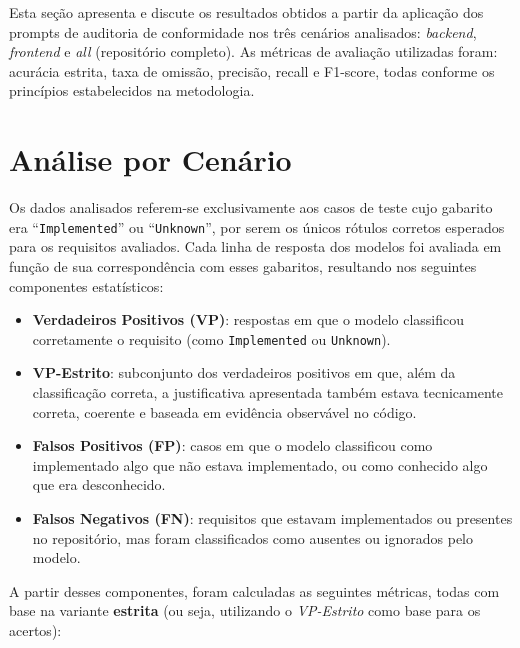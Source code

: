 \label{cap:resultados}

Esta seção apresenta e discute os resultados obtidos a partir da aplicação dos prompts de auditoria de conformidade nos três cenários analisados: \textit{backend}, \textit{frontend} e \textit{all} (repositório completo). As métricas de avaliação utilizadas foram: acurácia estrita, taxa de omissão, precisão, recall e F1-score, todas conforme os princípios estabelecidos na metodologia.

\section{Análise por Cenário}

Os dados analisados referem-se exclusivamente aos casos de teste cujo gabarito era “\texttt{Implemented}” ou “\texttt{Unknown}”, por serem os únicos rótulos corretos esperados para os requisitos avaliados. Cada linha de resposta dos modelos foi avaliada em função de sua correspondência com esses gabaritos, resultando nos seguintes componentes estatísticos:

\begin{itemize}
    \item \textbf{Verdadeiros Positivos (VP)}: respostas em que o modelo classificou corretamente o requisito (como \texttt{Implemented} ou \texttt{Unknown}).
    \item \textbf{VP-Estrito}: subconjunto dos verdadeiros positivos em que, além da classificação correta, a justificativa apresentada também estava tecnicamente correta, coerente e baseada em evidência observável no código.
    \item \textbf{Falsos Positivos (FP)}: casos em que o modelo classificou como implementado algo que não estava implementado, ou como conhecido algo que era desconhecido.
    \item \textbf{Falsos Negativos (FN)}: requisitos que estavam implementados ou presentes no repositório, mas foram classificados como ausentes ou ignorados pelo modelo.
\end{itemize}

A partir desses componentes, foram calculadas as seguintes métricas, todas com base na variante \textbf{estrita} (ou seja, utilizando o \textit{VP-Estrito} como base para os acertos):

